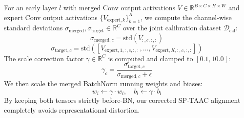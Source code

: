 \documentclass{article}
\theoremstyle{plain}
\theoremstyle{definition}
\theoremstyle{remark}
\begin{document}
For an early layer $l$ with merged Conv output activations $V \in \mathbb{R}^{B \times C \times H \times W}$ and expert Conv output activations $\{V_{\text{expert}, k}\}_{k=1}^K$, we compute the channel-wise standard deviations $\sigma_{\text{merged}}, \sigma_{\text{target}} \in \mathbb{R}^C$ over the joint calibration dataset $\mathcal{D}_{\text{cal}}$:
\begin{equation}
    \sigma_{\text{merged}, c} = \text{std}(V_{:, c, :, :})
\end{equation}
\begin{equation}
    \sigma_{\text{target}, c} = \text{std}([V_{\text{expert}, 1, :, c, :, :}, \dots, V_{\text{expert}, K, :, c, :, :}])
\end{equation}
The scale correction factor $\gamma \in \mathbb{R}^C$ is computed and clamped to $[0.1, 10.0]$:
\begin{equation}
    \gamma_c = \frac{\sigma_{\text{target}, c}}{\sigma_{\text{merged}, c} + \epsilon}
\end{equation}
We then scale the merged BatchNorm running weights and biases:
\begin{equation}
    w_l \leftarrow \gamma \cdot w_l, \quad b_l \leftarrow \gamma \cdot b_l
\end{equation}
By keeping both tensors strictly before-BN, our corrected SP-TAAC alignment completely avoids representational distortion.
\end{document}
